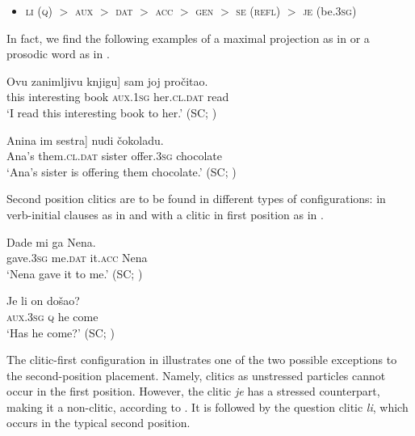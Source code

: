 \documentclass[output=paper,
colorlinks,
citecolor=brown,
newtxmath
]{langscibook}
\begin{document}
\begin{itemize}
\item \textsc{li} (\textsc{q}) $>$ \textsc{aux} $>$ \textsc{dat} $>$ \textsc{acc} $>$ \textsc{gen} $>$ \textsc{se} (\textsc{refl}) $>$ \textsc{je}
(be.\textsc{3sg})
\end{itemize}

\noindent In fact, we find the following examples of a maximal projection as in  or a prosodic word as in .


\ea\label{ex:19}
\gll\minsp{[} Ovu  zanimljivu  knjigu] sam      joj         pročitao.\\
    {} this  interesting book    \textsc{aux.1sg}  her.\textsc{cl.dat} read \\
\glt `I read this interesting book to her.'
\hfill (SC; \citealt[219]{Franks.King2000})
\z



\ea\label{ex:20}
\gll\minsp{[} Anina im          sestra] nudi      čokoladu.           \\
    {} Ana’s  them.\textsc{cl.dat} sister  offer.\textsc{3sg} chocolate \\
\glt `Ana’s sister is offering them chocolate.'
\hfill (SC; \citealt[414]{Progovac1996})
\z

\noindent Second position clitics are to be found in different types of configurations: in verb-initial clauses as in  and with a clitic in first position as in .


\ea\label{ex:21}
\gll Dade      mi      ga      Nena.           \\
     gave.\textsc{3sg} me.\textsc{dat}  it.\textsc{acc}  Nena \\
\glt `Nena gave it to me.'
\hfill (SC; \citealt[222]{Franks.King2000})
\z


\ea\label{ex:22}
\gll Je li on došao?\\
     \textsc{aux.3sg} \textsc{q} he come\\
\glt `Has he come?'
\hfill (SC; \citealt[46]{Radanovic-Kocic1988})
\z



\noindent The clitic-first configuration in  illustrates one of the two possible exceptions to the second-position placement. Namely, clitics as unstressed particles cannot occur in the first position. However, the clitic \textit{je} has a stressed counterpart, making it a non-clitic, according to \citet[226]{Franks.King2000}. It is followed by the question clitic \textit{li}, which occurs in the typical second position.
\end{document}

